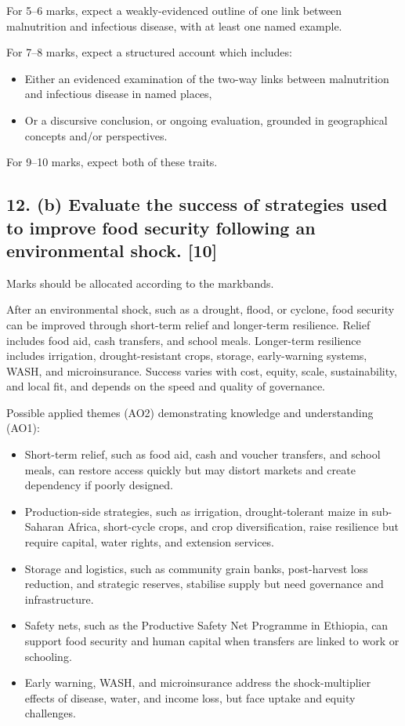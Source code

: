 \documentclass[11pt,a4paper]{article}
\begin{document}
For 5--6 marks, expect a weakly-evidenced outline of one link between
malnutrition and infectious disease, with at least one named example.

For 7--8 marks, expect a structured account which includes:
\begin{itemize}
  \item Either an evidenced examination of the two-way links between
  malnutrition and infectious disease in named places,
  \item Or a discursive conclusion, or ongoing evaluation, grounded in
  geographical concepts and/or perspectives.
\end{itemize}

For 9--10 marks, expect both of these traits.

\subsection*{12. (b) Evaluate the success of strategies used to improve food security following an environmental shock. \hfill[10]}

Marks should be allocated according to the markbands.

After an environmental shock, such as a drought, flood, or cyclone, food
security can be improved through short-term relief and longer-term resilience.
Relief includes food aid, cash transfers, and school meals. Longer-term
resilience includes irrigation, drought-resistant crops, storage, early-warning
systems, WASH, and microinsurance. Success varies with cost, equity, scale,
sustainability, and local fit, and depends on the speed and quality of
governance.

Possible applied themes (AO2) demonstrating knowledge and understanding (AO1):
\begin{itemize}
  \item Short-term relief, such as food aid, cash and voucher transfers, and
  school meals, can restore access quickly but may distort markets and create
  dependency if poorly designed.
  \item Production-side strategies, such as irrigation, drought-tolerant maize
  in sub-Saharan Africa, short-cycle crops, and crop diversification, raise
  resilience but require capital, water rights, and extension services.
  \item Storage and logistics, such as community grain banks, post-harvest
  loss reduction, and strategic reserves, stabilise supply but need governance
  and infrastructure.
  \item Safety nets, such as the Productive Safety Net Programme in Ethiopia,
  can support food security and human capital when transfers are linked to work
  or schooling.
  \item Early warning, WASH, and microinsurance address the shock-multiplier
  effects of disease, water, and income loss, but face uptake and equity
  challenges.
\end{itemize}
\end{document}
